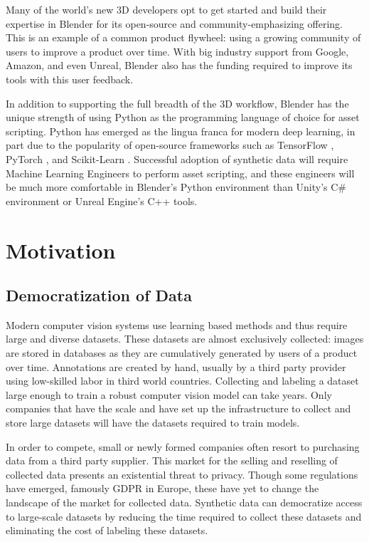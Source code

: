 \documentclass{article}
\begin{document}
Many of the world’s new 3D developers opt to get started and build their expertise in Blender for its open-source and community-emphasizing offering. This is an example of a common product flywheel: using a growing community of users to improve a product over time. With big industry support from Google, Amazon, and even Unreal, Blender also has the funding required to improve its tools with this user feedback.

In addition to supporting the full breadth of the 3D workflow, Blender has the unique strength of using Python as the programming language of choice for asset scripting. Python has emerged as the lingua franca for modern deep learning, in part due to the popularity of open-source frameworks such as TensorFlow \cite{tensorflow}, PyTorch \cite{pytorch}, and Scikit-Learn \cite{scikit-learn}. Successful adoption of synthetic data will require Machine Learning Engineers to perform asset scripting, and these engineers will be much more comfortable in Blender’s Python environment than Unity's C\# environment or Unreal Engine’s C++ tools.

\section{Motivation}
\label{sec:motivation}

\subsection{Democratization of Data}

Modern computer vision systems use learning based methods and thus require large and diverse datasets. These datasets are almost exclusively collected: images are stored in databases as they are cumulatively generated by users of a product over time. Annotations are created by hand, usually by a third party provider using low-skilled labor in third world countries. Collecting and labeling a dataset large enough to train a robust computer vision model can take years. Only companies that have the scale and have set up the infrastructure to collect and store large datasets will have the datasets required to train models.

In order to compete, small or newly formed companies often resort to purchasing data from a third party supplier. This market for the selling and reselling of collected data presents an existential threat to privacy. Though some regulations have emerged, famously GDPR in Europe, these have yet to change the landscape of the market for collected data. Synthetic data can democratize access to large-scale datasets by reducing the time required to collect these datasets and eliminating the cost of labeling these datasets.
\end{document}
